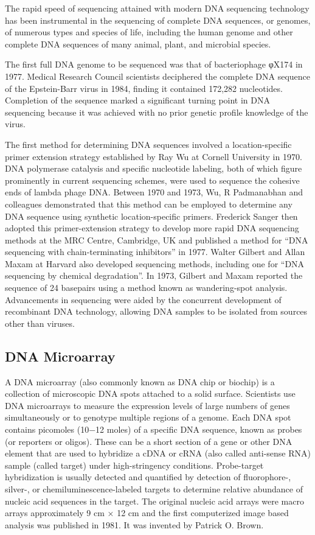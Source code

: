 The rapid speed of sequencing attained with modern DNA sequencing technology has been instrumental in the sequencing of complete DNA sequences, or genomes, of numerous types and species of life, including the human genome and other complete DNA sequences of many animal, plant, and microbial species.

The first full DNA genome to be sequenced was that of bacteriophage φX174 in 1977. Medical Research Council scientists deciphered the complete DNA sequence of the Epstein-Barr virus in 1984, finding it contained 172,282 nucleotides. Completion of the sequence marked a significant turning point in DNA sequencing because it was achieved with no prior genetic profile knowledge of the virus.

The first method for determining DNA sequences involved a location-specific primer extension strategy established by Ray Wu at Cornell University in 1970. DNA polymerase catalysis and specific nucleotide labeling, both of which figure prominently in current sequencing schemes, were used to sequence the cohesive ends of lambda phage DNA. Between 1970 and 1973, Wu, R Padmanabhan and colleagues demonstrated that this method can be employed to determine any DNA sequence using synthetic location-specific primers. Frederick Sanger then adopted this primer-extension strategy to develop more rapid DNA sequencing methods at the MRC Centre, Cambridge, UK and published a method for ``DNA sequencing with chain-terminating inhibitors'' in 1977. Walter Gilbert and Allan Maxam at Harvard also developed sequencing methods, including one for ``DNA sequencing by chemical degradation''. In 1973, Gilbert and Maxam reported the sequence of 24 basepairs using a method known as wandering-spot analysis. Advancements in sequencing were aided by the concurrent development of recombinant DNA technology, allowing DNA samples to be isolated from sources other than viruses.

\hypertarget{dna-microarray}{%
\subsection{DNA Microarray}\label{dna-microarray}}

A DNA microarray (also commonly known as DNA chip or biochip) is a collection of microscopic DNA spots attached to a solid surface. Scientists use DNA microarrays to measure the expression levels of large numbers of genes simultaneously or to genotype multiple regions of a genome. Each DNA spot contains picomoles (10−12 moles) of a specific DNA sequence, known as probes (or reporters or oligos). These can be a short section of a gene or other DNA element that are used to hybridize a cDNA or cRNA (also called anti-sense RNA) sample (called target) under high-stringency conditions. Probe-target hybridization is usually detected and quantified by detection of fluorophore-, silver-, or chemiluminescence-labeled targets to determine relative abundance of nucleic acid sequences in the target. The original nucleic acid arrays were macro arrays approximately 9 cm × 12 cm and the first computerized image based analysis was published in 1981. It was invented by Patrick O. Brown.

